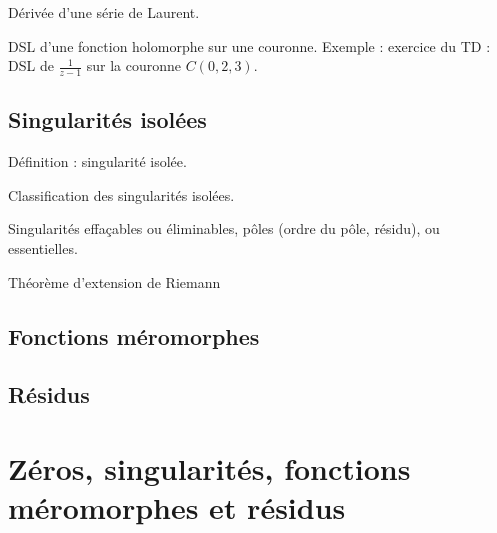 \documentclass[11pt,a4paper]{book}
\theoremstyle{definition}
\theoremstyle{plain}
\begin{document}
Dérivée d'une série de Laurent. %

DSL d'une fonction holomorphe sur une couronne. 
Exemple : exercice du TD : DSL de $\frac{1}{z-1}$ sur la couronne $C(0,2,3)$.


\section{Singularités isolées}


Définition : singularité isolée.

Classification des singularités isolées.

Singularités effaçables ou éliminables, pôles (ordre du pôle, résidu), ou essentielles.

Théorème d'extension de Riemann

\section{Fonctions méromorphes}

\section{Résidus}










\chapter{Zéros, singularités, fonctions méromorphes et résidus}
\end{document}
